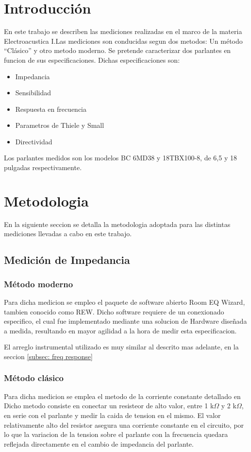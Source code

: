 \documentclass[]{article}
\begin{document}
\begin{multicols}{2}
\section{Introducción}
En este trabajo se describen las mediciones realizadas en el marco de la materia
Electroacustica I.Las mediciones son conducidas segun dos metodos: Un método ``Clásico'' y otro metodo
moderno. Se pretende caracterizar dos parlantes en funcion de sus especificaciones.
Dichas especificaciones son:
\begin{itemize}
  \item Impedancia
  \item Sensibilidad
  \item Respuesta en frecuencia
  \item Parametros de Thiele y Small
  \item{Directividad}
\end{itemize}

Los parlantes medidos son los modelos BC 6MD38 y 18TBX100-8, de 6,5 y 18
pulgadas respectivamente.
\section{Metodologia}
En la siguiente seccion se detalla la metodologia adoptada para las distintas
mediciones llevadas a cabo en este trabajo.

\subsection{Medición de Impedancia}

\subsubsection{Método moderno}
\label{subsec: z moderno}
Para dicha medicion se empleo el paquete de software abierto Room EQ Wizard, tambien
conocido como REW. Dicho software requiere de un conexionado especifico, el cual
fue implementado mediante una solucion de Hardware diseñada a medida, resultando
en mayor agilidad a la hora de medir esta especificacion.

El arreglo instrumental utilizado es muy similar al descrito mas adelante,
en la seccion \ref{subsec: freq response}

\subsubsection{Método clásico}
\label{z clasica}
Para dicha medicion se emplea el metodo de la corriente constante detallado en \cite{Ruffa}
Dicho metodo consiste en conectar un resisteor de alto valor, entre 1 k$\Omega$ y
2 k$\Omega$, en serie con el parlante y medir la caida de tension en el mismo.
El valor relativamente alto del resistor asegura una corriente constante en el
circuito, por lo que la variacion de la tension sobre el parlante con la frecuencia
quedara reflejada directamente en el cambio de impedancia del parlante.


\end{multicols}
\end{document}
